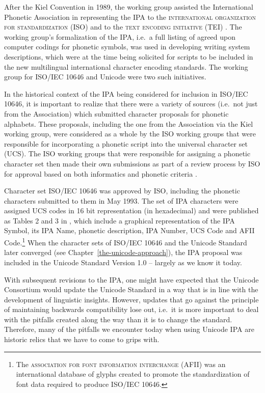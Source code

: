 After the Kiel Convention in 1989, the working group assisted
the International Phonetic Association in representing the IPA to the
\textsc{international organization for standardization} (ISO) and to the \textsc{text
encoding initiative} (TEI) \citep{EslingGaylord1993}. The working group's
formalization of the IPA, i.e.\ a full listing of agreed upon computer codings
for phonetic symbols, was used in developing writing system descriptions, which
were at the time being solicited for scripts to be included in the new
multilingual international character encoding standards. The working group for
ISO/IEC 10646 and Unicode were two such initiatives.

In the historical context of the IPA being considered for inclusion in 
ISO/IEC 10646, it is important to realize that there were a variety of 
sources (i.e.\ not just from the Association) which submitted character 
proposals for phonetic alphabets. These proposals, including the one from the 
Association via the Kiel working group, were considered as a whole by 
the ISO working groups that were responsible for incorporating a phonetic 
script into the universal character set (UCS). The ISO working groups that 
were responsible for assigning a phonetic character set then made their 
own submissions as part of a review process by ISO for approval based on 
both informatics and phonetic criteria \citep[86]{EslingGaylord1993}. 

Character set ISO/IEC 10646 was approved by ISO, including the phonetic
characters submitted to them in May 1993. The set of IPA characters were
assigned UCS codes in 16 bit representation (in hexadecimal) and were published
as Tables 2 and 3 in \cite{EslingGaylord1993}, which include a graphical
representation of the IPA Symbol, its IPA Name, phonetic description, IPA
Number, UCS Code and AFII Code.\footnote{The \textsc{association for font
information interchange} (AFII) was an international database of glyphs created
to promote the standardization of font data required to produce ISO/IEC 10646.} When the
character sets of ISO/IEC 10646 and the Unicode Standard later converged (see
Chapter~\ref{the-unicode-approach}), the IPA proposal was
included in the Unicode Standard Version 1.0 -- largely as we know it
today.

With subsequent revisions to the IPA, one might have expected that the Unicode
Consortium would update the Unicode Standard in a way that is in line with the
development of linguistic insights. However, updates that go against the principle
of maintaining backwards compatibility lose out, i.e.\ it is more important to
deal with the pitfalls created along the way than it is to change the standard.
Therefore, many of the pitfalls we encounter today when using Unicode IPA are
historic relics that we have to come to grips with.

